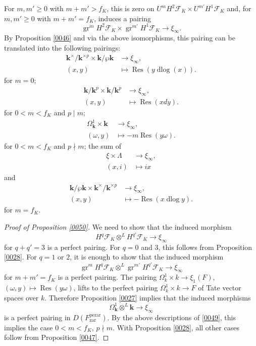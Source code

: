 \documentclass{amsart}
\theoremstyle{remark}
\numberwithin{equation}{subsection}
\newcommand{\tensor}{\mathbin{\otimes}}
\newcommand{\zar}{\mathrm{zar}}
\newcommand{\perar}{\mathrm{perar}}
\newcommand{\alg}[1]{\mathbf{#1}}
\DeclareMathOperator{\Res}{Res}
\DeclareMathOperator{\gr}{gr}
\DeclareMathOperator{\dlog}{dlog}
\begin{document}
For $m, m' \ge 0$ with $m + m' > f_{K}$, this is zero on
	$
			U^{m} H^{2} \mathcal{F}_{K}
		\times
			U^{m'} H^{1} \mathcal{F}_{K}
	$
and, for $m, m' \ge 0$ with $m + m' = f_{K}$, induces a pairing
	\begin{equation} \label{0049}
				\gr^{m} H^{2} \mathcal{F}_{K}
			\times
				\gr^{m'} H^{1} \mathcal{F}_{K}
		\to
			\xi_{\infty}.
	\end{equation}
By Proposition \ref{0046}
and via the above isomorphisms,
this pairing can be translated into the following pairings:
	\begin{align*}
				\alg{k}^{\times} / \alg{k}^{\times p} \times \alg{k} / \wp \alg{k}
		&	\to
				\xi_{\infty},
		\\
				(x, y)
		&	\mapsto
				\Res(y \dlog(x)).
	\end{align*}
for $m = 0$;
	\begin{align*}
				\alg{k} / \alg{k}^{p} \times \alg{k} / \alg{k}^{p}
		&	\to
				\xi_{\infty},
		\\
				(x, y)
		&	\mapsto
				\Res(x d y).
	\end{align*}
for $0 < m < f_{K}$ and $p \mid m$;
	\begin{align*}
				\Omega_{\alg{k}}^{1} \times \alg{k}
		&	\to
				\xi_{\infty},
		\\
				(\omega, y)
		&	\mapsto
				- m \Res(y \omega).
	\end{align*}
for $0 < m < f_{K}$ and $p \nmid m$;
the sum of
	\begin{align*}
				\xi \times \Lambda
		&	\to
				\xi_{\infty},
		\\
				(x, i)
		&	\mapsto
				i x
	\end{align*}
and
	\begin{align*}
				\alg{k} / \wp \alg{k} \times \alg{k}^{\times} / \alg{k}^{\times p}
		&	\to
				\xi_{\infty},
		\\
				(x, y)
		&	\mapsto
				- \Res(x \dlog y).
	\end{align*}
for $m = f_{K}$.

\begin{proof}[Proof of Proposition \ref{0050}]
	We need to show that the induced morphism
		\[
				H^{q} \mathcal{F}_{K} \tensor^{L} H^{q'} \mathcal{F}_{K}
			\to
				\xi_{\infty}
		\]
	for $q + q' = 3$ is a perfect pairing.
	For $q = 0$ and $3$, this follows from Proposition \ref{0028}.
	For $q = 1$ or $2$, it is enough to show that the induced morphism
		\[
				\gr^{m} H^{q} \mathcal{F}_{K} \tensor^{L} \gr^{m'} H^{q'} \mathcal{F}_{K}
			\to
				\xi_{\infty}
		\]
	for $m + m' = f_{K}$ is a perfect pairing.
	The pairing $\Omega_{k}^{1} \times k \to \xi_{1}(F)$,
	$(\omega, y) \mapsto \Res(y \omega)$,
	lifts to the perfect pairing
	$\Omega_{k}^{1} \times k \to F$
	of Tate vector spaces over $k$.
	Therefore Proposition \ref{0027}
	implies that the induced morphisms
		\[
				\Omega_{\alg{k}}^{1} \tensor^{L} \alg{k}
			\to
				\xi_{\infty}
		\]
	is a perfect pairing in $D(F^{\perar}_{\zar})$.
	By the above descriptions of \eqref{0049},
	this implies the case $0 < m < f_{K}$, $p \nmid m$.
	With Proposition \ref{0028},
	all other cases follow from
	Proposition \ref{0047}.
\end{proof}
\end{document}
